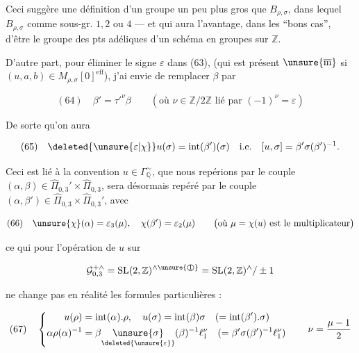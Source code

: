Ceci suggère une définition d'un groupe un peu plus gros que $B_{\rho,\sigma}$,
dans lequel $B_{\rho,\sigma}$  
comme sous-gr.  
$1,2$ ou $4$ --- et qui aura l'avantage, dans les ``bons cas'', d'être le groupe
des pts adéliques d'un schéma en groupes  sur $\mathbb Z$.

D'autre part, pour  éliminer le signe
$\varepsilon$ dans (63), (qui est présent $\unsure{\overline{\mathrm m}}$ si
$(u,a,b)\in M_{\rho,\sigma}[0]^{\mathrm{eff}}$), j'ai envie de remplacer $\beta$ par


\[
(64)\quad \beta'=\tau'^{\nu}\beta
\qquad\left(\text{où }\nu\in\mathbb Z/2\mathbb Z\text{ lié par }
(-1)^\nu=\varepsilon\right)
\]

De sorte qu'on aura

\[
(65)\quad \deleted{\unsure{\varepsilon|\chi}}u(\sigma)=\operatorname{int}(\beta')(\sigma)
\quad\text{i.e.}\quad [u,\sigma]=\beta'\sigma(\beta')^{-1}.
\]

Ceci est lié à la convention 
$u\in\Gamma_{\mathbb Q}^{\sim}$, que nous repérions par le couple
$(\alpha,\beta)\in\widehat{\Pi}_{0,3}'\times\widehat{\Pi}_{0,3}$,
sera désormais repéré par le couple
$(\alpha,\beta')\in\widehat{\Pi}_{0,3}\times\widehat{\Pi}_{0,3}'$, avec

\[
(66)\quad\unsure{\chi}(\alpha)=\varepsilon_3(\mu),
\quad\chi(\beta')=\varepsilon_2(\mu)
\qquad\bigl(\text{où }\mu=\chi(u)\text{ est le multiplicateur}\bigr)
\]

ce qui  pour l'opération de $u$ sur

\[
\mathcal G_{0,3}^{+\wedge}
=\mathrm{SL}(2,\mathbb Z)^{\wedge\unsure{\text{\textcircled{1}}}}
=\mathrm{SL}(2,\mathbb Z)^{\wedge}/\pm1
\]

ne change pas en réalité les formules particulières :

\[
(67)\quad\left\{\begin{aligned}
u(\rho)&=\operatorname{int}(\alpha).\rho,\quad
u(\sigma)=\operatorname{int}(\beta)\sigma
\quad(=\operatorname{int}(\beta').\sigma)\\
\alpha\rho(\alpha)^{-1}
&=\beta\underset{\deleted{\unsure{\varepsilon}}}{\unsure{\sigma}}(\beta)^{-1}\ell_1^\nu
\quad(=\beta'\sigma(\beta')^{-1}\ell_1^\nu)
\end{aligned}\right.
\qquad\nu=\frac{\mu-1}{2}
\]

